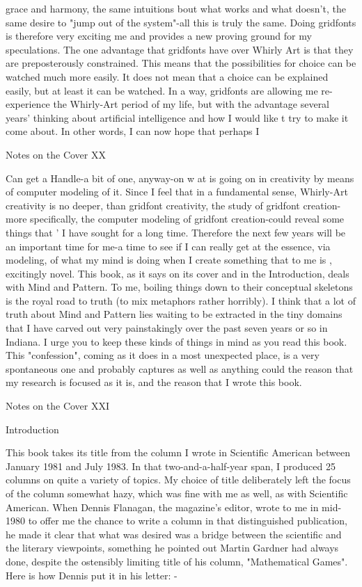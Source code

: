 grace and harmony, the same intuitions bout what works and what doesn't, the same
desire to "jump out of the system"-all this is truly the same. Doing gridfonts is
therefore very exciting me and provides a new proving ground for my speculations.
The one advantage that gridfonts have over Whirly Art is that they are preposterously
constrained. This means that the possibilities for choice can be watched much more
easily. It does not mean that a choice can be explained easily, but at least it can be
watched. In a way, gridfonts are allowing me re-experience the Whirly-Art period of
my life, but with the advantage several years' thinking about artificial intelligence and
how I would like t try to make it come about. In other words, I can now hope that
perhaps I




Notes on the Cover                                                                   XX

Can get a Handle-a bit of one, anyway-on w at is going on in creativity by means of
computer modeling of it.
        Since I feel that in a fundamental sense, Whirly-Art creativity is no deeper,
than gridfont creativity, the study of gridfont creation-more specifically, the computer
modeling of gridfont creation-could reveal some things that ' I have sought for a long
time. Therefore the next few years will be an important time for me-a time to see if I
can really get at the essence, via modeling, of what my mind is doing when I create
something that to me is , excitingly novel.
        This book, as it says on its cover and in the Introduction, deals with Mind
and Pattern. To me, boiling things down to their conceptual skeletons is the royal road
to truth (to mix metaphors rather horribly). I think that a lot of truth about Mind and
Pattern lies waiting to be extracted in the tiny domains that I have carved out very
painstakingly over the past seven years or so in Indiana. I urge you to keep these
kinds of things in mind as you read this book. This "confession", coming as it does in
a most unexpected place, is a very spontaneous one and probably captures as well as
anything could the reason that my research is focused as it is, and the reason that I
wrote this book.




Notes on the Cover                                                                 XXI

                                   Introduction

         This book takes its title from the column I wrote in Scientific American
between January 1981 and July 1983. In that two-and-a-half-year span, I produced 25
columns on quite a variety of topics. My choice of title deliberately left the focus of
the column somewhat hazy, which was fine with me as well, as with Scientific
American. When Dennis Flanagan, the magazine's editor, wrote to me in mid-1980 to
offer me the chance to write a column in that distinguished publication, he made it
clear that what was desired was a bridge between the scientific and the literary
viewpoints, something he pointed out Martin Gardner had always done, despite the
ostensibly limiting title of his column, "Mathematical Games". Here is how Dennis
put it in his letter: -

